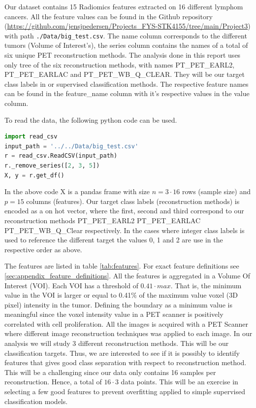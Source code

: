 Our dataset contains 15 Radiomics features extracted on 16 different lymphom
cancers. All the feature values can be found in the Github repository (\url{https://github.com/jensjpedersen/Projects_FYS-STK4155/tree/main/Project3}) with path
\verb|./Data/big_test.csv|. The name column corresponds to the different tumors
(Volume of Interest's), the series column contains the names of a total of six
unique PET reconstruction methods. The analysis done in this report uses only
tree of the six reconstruction methods, with names PT\_PET\_EARL2,
PT\_PET\_EARLAC and PT\_PET\_WB\_Q\_CLEAR. They will be our target class
labels in or supervised classification methods. The respective feature names
can be found in the feature\_name column with it's respective values in the
value column.  

To read the data, the following python code can be used. 
\begin{lstlisting}[language=Python]
import read_csv
input_path = '../../Data/big_test.csv'
r = read_csv.ReadCSV(input_path)
r._remove_series([2, 3, 5])
X, y = r.get_df()
\end{lstlisting}
In the above code X is a pandas frame with size $n=3 \cdot 16$ rows (sample
size) and $p = 15$ columns (features). Our target class labels (reconstruction
methods) is encoded as a
on hot vector, where the first, second and third correspond to our
reconstruction methods 
PT\_PET\_EARL2  PT\_PET\_EARLAC  PT\_PET\_WB\_Q\_Clear respectively. In the
cases where integer class labels is used to reference the different target the
values 0, 1 and 2 are use in the respective order as above. 

The features are listed in table \ref{tab:features}. For exact feature
definitions see \ref{sec:appendix_feature_definitions}. All the features is
aggregated in a Volume Of Interest (VOI). Each VOI has a
threshold of $0.41 \cdot max$. 
That is, the minimum value in the VOI is larger or equal to 0.41\% of the
maximum value voxel (3D pixel) intensity in the tumor. Defining the boundary as a minimum
value is meaningful since the voxel intensity value in a PET scanner
is positively correlated with cell proliferation. 
All the images is acquired with a PET Scanner %
where different image reconstruction techniques was applied to each image. In our analysis we will study 3
different reconstruction methods. This will be our classification
targets. Thus, we are interested to see if it is possibly to identify features
that gives good class separation with respect to reconstruction method. This
will be a challenging since our data only contains 16 samples per
reconstruction. Hence, a total of $16 \cdot 3$ data points. 
This will be an exercise in selecting a few good features to prevent
overfitting applied to simple supervised classification models.   


